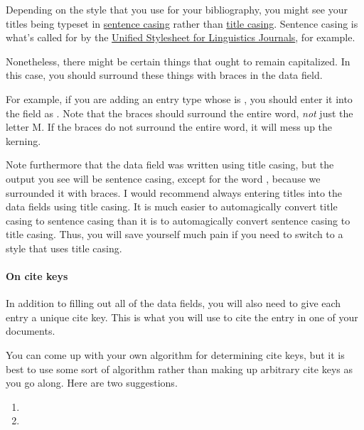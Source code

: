 Depending on the style that you use for your bibliography, you might see your titles being typeset in \href{https://en.wiktionary.org/wiki/sentence_case}{sentence casing} rather than \href{https://en.wiktionary.org/wiki/title_case}{title casing}.
Sentence casing is what's called for by the \href{http://celxj.org/downloads/UnifiedStyleSheet.pdf}{Unified Stylesheet for Linguistics Journals}, for example.

Nonetheless, there might be certain things that ought to remain capitalized.
In this case, you should surround these things with braces in the data field.

For example, if you are adding an  entry type whose  is , you should enter it into the  field as .
Note that the braces should surround the entire word, \emph{not} just the letter M.
If the braces do not surround the entire word, it will mess up the kerning.

Note furthermore that the data field was written using title casing, but the output you see will be sentence casing, except for the word , because we surrounded it with braces.
I would recommend always entering titles into the data fields using title casing.
It is much easier to automagically convert title casing to sentence casing than it is to automagically convert sentence casing to title casing.
Thus, you will save yourself much pain if you need to switch to a style that uses title casing.

\paragraph{On cite keys}

In addition to filling out all of the data fields, you will also need to give each entry a unique cite key.
This is what you will use to cite the entry in one of your  documents.

You can come up with your own algorithm for determining cite keys, but it is best to use some sort of algorithm rather than making up arbitrary cite keys as you go along.
Here are two suggestions.

\begin{enumerate}[label={(\roman*)}]

	\item{}
	
	\item{}

\end{enumerate}

